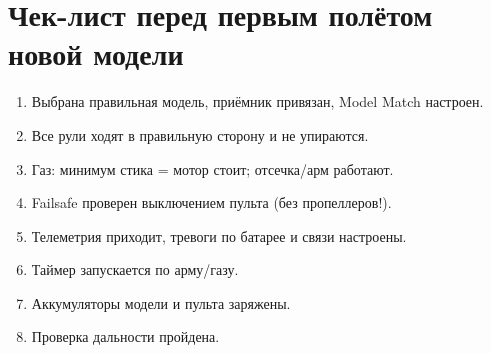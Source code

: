 \section{Чек-лист перед первым полётом новой модели}

\begin{enumerate}[label=\chkbox]
  \item Выбрана правильная модель, приёмник привязан, Model Match настроен.
  \item Все рули ходят в правильную сторону и не упираются.
  \item Газ: минимум стика = мотор стоит; отсечка/арм работают.
  \item Failsafe проверен выключением пульта (без пропеллеров!).
  \item Телеметрия приходит, тревоги по батарее и связи настроены.
  \item Таймер запускается по арму/газу.
  \item Аккумуляторы модели и пульта заряжены.
  \item Проверка дальности пройдена.
\end{enumerate}
